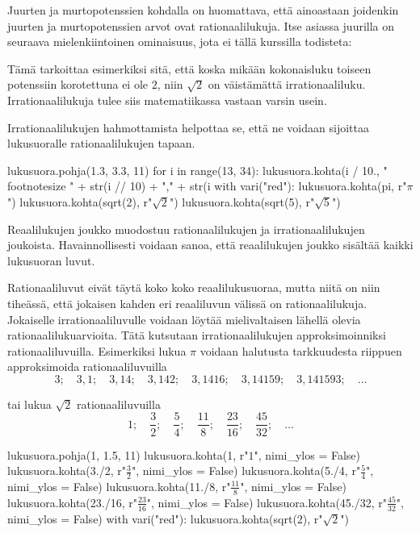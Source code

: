 Juurten ja murtopotenssien kohdalla on huomattava, että ainoastaan joidenkin juurten ja murtopotenssien arvot ovat rationaalilukuja. Itse asiassa juurilla on seuraava mielenkiintoinen ominaisuus, jota ei tällä kurssilla todisteta:


Tämä tarkoittaa esimerkiksi sitä, että koska mikään kokonaisluku toiseen potenssiin korotettuna ei ole $2$, niin $\sqrt{2}$ on väistämättä irrationaaliluku. Irrationaalilukuja tulee siis matematiikassa vastaan varsin usein.

Irrationaalilukujen hahmottamista helpottaa se, että ne voidaan sijoittaa lukusuoralle rationaalilukujen tapaan.

\begin{kuva}
lukusuora.pohja(1.3, 3.3, 11)
for i in range(13, 34):
	lukusuora.kohta(i / 10., "\\footnotesize " + str(i // 10) + "," + str(i %
with vari("red"):
	lukusuora.kohta(pi, r"$\pi$")
	lukusuora.kohta(sqrt(2), r"$\sqrt{2}$")
	lukusuora.kohta(sqrt(5), r"$\sqrt{5}$")
\end{kuva}

Reaalilukujen joukko muodostuu rationaalilukujen ja irrationaalilukujen joukoista. Havainnollisesti voidaan sanoa, että reaalilukujen joukko sisältää kaikki lukusuoran luvut.

Rationaaliluvut eivät täytä koko koko reaalilukusuoraa, mutta niitä on niin tiheässä, että jokaisen kahden eri reaaliluvun välissä on rationaalilukuja. Jokaiselle irrationaaliluvulle voidaan löytää mielivaltaisen lähellä olevia rationaalilukuarvioita. Tätä kutsutaan irrationaalilukujen approksimoinniksi rationaaliluvuilla. Esimerkiksi lukua $\pi$ voidaan halutusta tarkkuudesta riippuen approksimoida rationaaliluvuilla
\[
3; \quad 3,1; \quad 3,14; \quad 3,142; \quad 3,1416; \quad 3,14159; \quad 3,141593; \quad \ldots 
\]

tai lukua $\sqrt{2}$ rationaaliluvuilla
\[
1; \quad \frac{3}{2}; \quad \frac{5}{4}; \quad \frac{11}{8}; \quad \frac{23}{16}; \quad \frac{45}{32}; \quad \ldots 
\]

\begin{kuva}
lukusuora.pohja(1, 1.5, 11)
lukusuora.kohta(1, r"\footnotesize $1$", nimi_ylos = False)
lukusuora.kohta(3./2, r"\footnotesize $\frac{3}{2}$", nimi_ylos = False)
lukusuora.kohta(5./4, r"\footnotesize $\frac{5}{4}$", nimi_ylos = False)
lukusuora.kohta(11./8, r"\footnotesize $\frac{11}{8}$", nimi_ylos = False)
lukusuora.kohta(23./16, r"\footnotesize $\frac{23}{16}$", nimi_ylos = False)
lukusuora.kohta(45./32, r"\footnotesize $\frac{45}{32}$", nimi_ylos = False)
with vari("red"):
	lukusuora.kohta(sqrt(2), r"$\sqrt{2}$")
\end{kuva}

